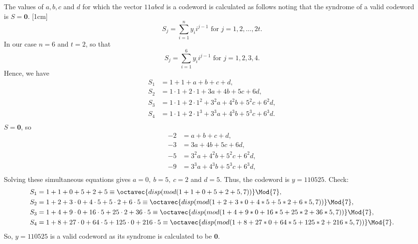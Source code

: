 The values of $a, b, c$ and $d$ for which the vector $11abcd$ is a codeword is calculated as follows noting that the syndrome of a valid codeword is $S = \bm{0}$.
[1cm]
\[
	S_j = \sum_{i=1}^n y_i i^{j-1}\textrm{ for } j=1, 2, \ldots, 2t.
\]
In our case $n=6$ and $t=2$, so that 
\[
	S_j = \sum_{i=1}^6 y_i i^{j-1}\textrm{ for } j=1, 2, 3, 4.
\]
Hence, we have
\begin{align*}
	S_1 &= 1 + 1 + a + b + c + d,\\
	S_2 &= 1\cdot1 + 2\cdot1 + 3a + 4b + 5c + 6d,\\
	S_3 &= 1\cdot1 + 2\cdot1^2 + 3^2a + 4^2b + 5^2c + 6^2d,\\
	S_4 &= 1\cdot1 + 2\cdot1^3 + 3^3a + 4^3b + 5^3c + 6^3d.\\
\end{align*}
$S=\bm{0}$, so
\begin{align*}
	-2 &= a + b + c + d,\\
	-3 &= 3a + 4b + 5c + 6d,\\
	-5 &= 3^2a + 4^2b + 5^2c + 6^2d,\\
	-9 &= 3^3a + 4^3b + 5^3c + 6^3d,\\
\end{align*}
Solving these simultaneous equations gives $a=0,\ b=5,\ c=2$ and $d=5$. Thus, the codeword is $y=110525$.  Check:
\begin{align*}
	S_1 &= 1 + 1 + 0 + 5 + 2 + 5 \equiv \octavec{disp(mod(1 + 1 + 0 + 5 + 2 + 5,7))} \Mod{7},\\
	S_2 &= 1 + 2 + 3\cdot0 + 4\cdot5 + 5\cdot2 + 6\cdot5 \equiv \octavec{disp(mod( 1 + 2 + 3*0 + 4*5 + 5*2 + 6*5,7))} \Mod{7},\\
	S_3 &= 1 + 4  + 9\cdot0 + 16\cdot5 + 25\cdot2 + 36\cdot5 \equiv \octavec{disp(mod(1 + 4  + 9*0 + 16*5 + 25*2 + 36*5,7))} \Mod{7},\\
	S_4 &= 1 + 8 + 27\cdot0 + 64\cdot5 + 125\cdot0 + 216\cdot5 \equiv \octavec{disp(mod(1 + 8 + 27*0 + 64*5 + 125*2 + 216*5,7))} \Mod{7}.
\end{align*}
So,  $y=110525$ is a valid codeword as its syndrome is calculated to be $\bm{0}$.